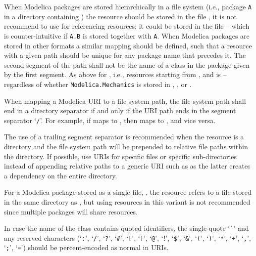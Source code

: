 When Modelica packages are stored hierarchically in a file system (i.e., package \lstinline!A! in a directory  containing ) the resource
 should be stored in the file , it is not recommend to use  for referencing resources; it could be stored in the file  -- which is counter-intuitive if \lstinline!A.B! is stored together with \lstinline!A!.
When Modelica packages are stored in other formats a similar mapping should be defined, such that a resource with a given path should be unique for any package name that precedes it.
The second segment of the path shall not be the name of a class in the package given by the first segment.
As above for , i.e., resources starting from , and  is  -- regardless of whether \lstinline!Modelica.Mechanics! is stored in , , or .

When mapping a Modelica URI to a file system path, the file system path shall end in a directory separator if and only if the URI path ends in the segment separator `\lstinline!/!'.
For example, if  maps to , then  maps to , and vice versa.

\begin{nonnormative}
The use of a trailing segment separator is recommended when the resource is a directory and the file system path will be prepended to relative file paths within the directory.
If possible, use URIs for specific files or specific sub-directories instead of appending relative paths to a generic URI such as  as the latter creates a dependency on the entire directory.
\end{nonnormative}

For a Modelica-package stored as a single file, , the resource  refers to a file  stored in the same directory as , but using resources in this variant is not recommended since multiple packages will share resources.

In case the name of the class contains quoted identifiers, the single-quote `\lstinline!`!' and any reserved characters (`\lstinline!:!', `\lstinline!/!', `\lstinline!?!', `\lstinline!#!', `\lstinline![!', `\lstinline!]!', `\lstinline!@!', `\lstinline!!!', `\lstinline[mathescape=false]!$!', `\lstinline!&!', `\lstinline!(!', `\lstinline!)!', `\lstinline!*!', `\lstinline!+!', `\lstinline!,!', `\lstinline!;!', `\lstinline!=!') should be percent-encoded as normal in URIs.

